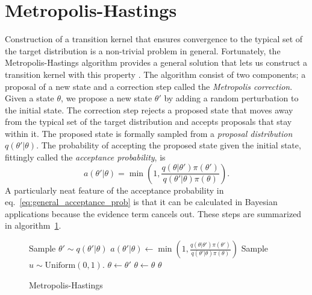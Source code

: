 \section{Metropolis-Hastings}
Construction of a transition kernel that ensures convergence to the typical set of the target distribution is a non-trivial problem in general.
Fortunately, the Metropolis-Hastings algorithm provides a general solution that lets us construct 
a transition kernel with this property \cite{metropolis,metropolis_two}. 
The algorithm consist of two components; a proposal of a new state and a correction step called the \textit{Metropolis correction}.
Given a state $\theta$, we propose a new state $\theta'$ by adding a random perturbation to the initial state.
The correction step rejects a proposed state that moves away from the typical set of the target distribution
and accepts proposals that stay within it.
The proposed state is formally sampled from a \textit{proposal distribution} $q(\theta'|\theta)$.
The probability of accepting the proposed state given the initial state, fittingly called the \textit{acceptance probability}, is 
\begin{equation}\label{eq:general_acceptance_prob}
    a(\theta'|\theta) = \min \left(1, \frac{q(\theta|\theta')\pi(\theta')}{q(\theta'|\theta)\pi (\theta)}\right).
\end{equation}
A particularly neat feature of the acceptance probability in eq.~\eqref{eq:general_acceptance_prob} is that it can be calculated in Bayesian applications because the evidence term cancels out.
 These steps are summarized in algorithm~\ref{algo:general_metropolis}.
\begin{figure}[H]
    \begin{algorithm}[H]
      \caption{Metropolis-Hastings}\label{algo:general_metropolis}
      \begin{algorithmic}
        \State Sample $\theta' \sim q(\theta'|\theta)$
        \State $\displaystyle{a(\theta'|\theta) \leftarrow \min \left(1, \frac{q(\theta|\theta')\pi(\theta')}{q(\theta'|\theta)\pi (\theta)}\right)}$
        \State Sample $u \sim \text{Uniform}(0,1)$.
          \State $\theta \leftarrow \theta'$ 
        \Else
          \State $\theta \leftarrow \theta$  
        \EndIf 
        \State \Return $\theta$
        \EndFunction
      \end{algorithmic}
    \end{algorithm}
  \end{figure}

